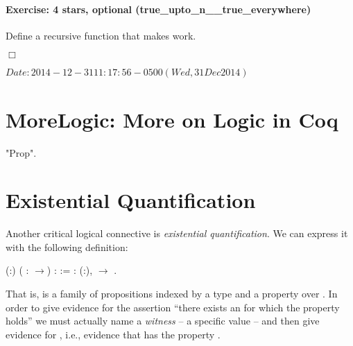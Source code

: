\documentclass[12pt]{report}
\begin{document}
\paragraph{Exercise: 4 stars, optional (true\_upto\_n\_\_true\_everywhere)}

 Define a recursive function
     that makes
     work. \begin{coqdoccode}
\coqdocemptyline
\end{coqdoccode}
\ensuremath{\Box} 

 $Date: 2014-12-31 11:17:56 -0500 (Wed, 31 Dec 2014) $ \begin{coqdoccode}
\coqdocemptyline
\end{coqdoccode}

\begin{coqdoccode}
\end{coqdoccode}
\section{MoreLogic: More on Logic in Coq}

\begin{coqdoccode}
\coqdocemptyline
\coqdocnoindent
{}  "Prop".\coqdoceol
\coqdocemptyline
\end{coqdoccode}
\section{Existential Quantification}



 Another critical logical connective is \textit{existential
    quantification}.  We can express it with the following
    definition: \begin{coqdoccode}
\coqdocemptyline
\coqdocnoindent
{}  (:) ( : \ensuremath{\rightarrow}) :  :=\coqdoceol
\coqdocindent{1.00em}
 : \coqdockw{\ensuremath{\forall}} (:),   \ensuremath{\rightarrow}   .\coqdoceol
\coqdocemptyline
\end{coqdoccode}
That is,  is a family of propositions indexed by a type 
    and a property  over .  In order to give evidence for the
    assertion ``there exists an  for which the property  holds''
    we must actually name a \textit{witness} -- a specific value  -- and
    then give evidence for  , i.e., evidence that  has the
    property . 
\end{document}
